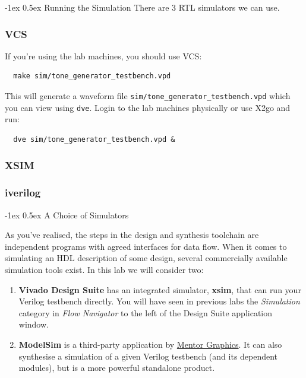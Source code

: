 \documentclass[11pt]{article}
\makeatletter
\renewcommand{\subsection}
{\@startsection {subsection}{1}{0pt}
 {-1ex}
 {0.5ex}
 {\bfseries\normalsize}}
\makeatother
\begin{document}
\subsection{Running the Simulation}
There are 3 RTL simulators we can use.

\subsubsection{VCS}
If you're using the lab machines, you should use VCS:
\begin{verbatim}
  make sim/tone_generator_testbench.vpd
\end{verbatim}
This will generate a waveform file \verb|sim/tone_generator_testbench.vpd| which you can view using \verb|dve|.
Login to the lab machines physically or use X2go and run:
\begin{verbatim}
  dve sim/tone_generator_testbench.vpd &
\end{verbatim}

\subsubsection{XSIM}

\subsubsection{iverilog}

\subsection{A Choice of Simulators}

As you've realised, the steps in the design and synthesis toolchain are independent programs with agreed interfaces for data flow. When it comes to simulating an HDL description of some design, several commercially available simulation tools exist. In this lab we will consider two:

\begin{enumerate}
  \item \textbf{Vivado Design Suite} has an integrated simulator, \textbf{xsim}, that can run your Verilog testbench directly. You will have seen in previous labs the \emph{Simulation} category in \emph{Flow Navigator} to the left of the Design Suite application window.
  \item \textbf{ModelSim} is a third-party application by \href{https://www.mentor.com/products/fv/modelsim/}{Mentor Graphics}. It can also synthesise a simulation of a given Verilog testbench (and its dependent modules), but is a more powerful standalone product.
\end{enumerate}
\end{document}

